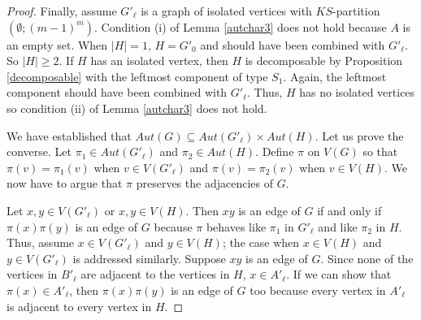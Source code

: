 \documentclass[11pt]{article}
\begin{document}
\begin{proof}


Finally, assume $G'_\ell$ is a graph of isolated vertices with $KS$-partition $(\emptyset; (m-1)^m)$.  
Condition (i) of Lemma \ref{autchar3} does not hold because $A$ is an empty set.  When $|H| = 1$, $H = G'_0$ and should have been combined with $G'_\ell$.  So $|H| \ge 2$.   If $H$ has an isolated vertex, then $H$ is decomposable by Proposition \ref{decomposable} with the leftmost component of type $S_1$.  Again, the leftmost component should have been combined with $G'_\ell$.  Thus, $H$ has no isolated vertices so condition (ii) of Lemma \ref{autchar3} does not hold.

We have established that $Aut(G) \subseteq Aut(G'_\ell) \times Aut(H)$.  Let us prove the converse.  Let $\pi_1 \in Aut(G'_\ell)$ and $\pi_2 \in Aut(H)$.   Define $\pi$ on $V(G)$ so that $\pi(v) = \pi_1(v)$ when $v \in V(G'_\ell)$ and $\pi(v) = \pi_2(v)$ when $v \in V(H)$.  We now have to argue that $\pi$ preserves the adjacencies of $G$.  

Let $x, y \in V(G'_\ell)$ or $x, y \in V(H)$.  Then $xy$ is an edge of $G$ if and only if $\pi(x) \pi(y)$ is an edge of $G$ because $\pi$ behaves like $\pi_1$ in $G'_\ell$ and like $\pi_2$ in $H$. 
 Thus, assume $x \in V(G'_\ell)$ and $y \in V(H)$; the case when $x \in V(H)$ and $y \in V(G'_\ell)$ is addressed similarly.   Suppose $xy$ is an edge of $G$.  Since none of the vertices in $B'_\ell$ are adjacent to the vertices in $H$,  $x \in A'_\ell$.   If we can show that $\pi(x) \in A'_\ell$, then $\pi(x) \pi(y)$ is an edge of $G$ too because every vertex in $A'_\ell$ is adjacent to every vertex in $H$.  


\end{proof}
\end{document}
